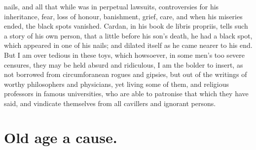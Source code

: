 {{nails, and all that while was in perpetual lawsuits, controversies for
his inheritance, fear, loss of honour, banishment, grief, care, \etc{} and
when his miseries ended, the black spots vanished. Cardan, in his book
de libris propriis, tells such a story of his own person, that a little
before his son's death, he had a black spot, which appeared in one of
his nails; and dilated itself as he came nearer to his end. But I am
over tedious in these toys, which howsoever, in some men's too severe
censures, they may be held absurd and ridiculous, I am the bolder to
insert, as not borrowed from circumforanean rogues and gipsies, but out
of the writings of worthy philosophers and physicians, yet living some
of them, and religious professors in famous universities, who are able
to patronise that which they have said, and vindicate themselves from
all cavillers and ignorant persons.

\section{Old age a cause.}

}}
